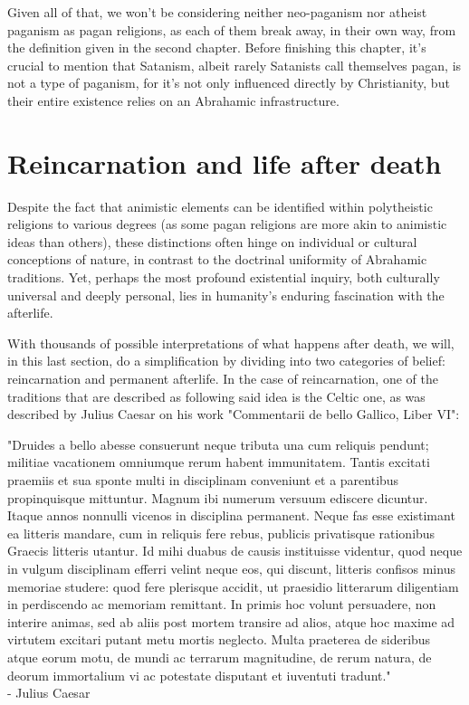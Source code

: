 Given all of that, we won't be considering neither neo-paganism nor atheist paganism as pagan religions, as
each of them break away, in their own way, from the definition given in the second chapter. Before finishing
this chapter, it's crucial to mention that Satanism, albeit rarely Satanists call themselves pagan, is not a
type of paganism, for it's not only influenced directly by Christianity, but their entire existence relies on
an Abrahamic infrastructure.

\section{Reincarnation and life after death}
Despite the fact that animistic elements can be identified within polytheistic religions to various degrees
(as some pagan religions are more akin to animistic ideas than others), these distinctions often hinge on
individual or cultural conceptions of nature, in contrast to the doctrinal uniformity of Abrahamic traditions.
Yet, perhaps the most profound existential inquiry, both culturally universal and deeply personal, lies in
humanity's enduring fascination with the afterlife.

With thousands of possible interpretations of what happens after death, we will, in this last section, do a
simplification by dividing into two categories of belief: reincarnation and permanent afterlife. In the case
of reincarnation, one of the traditions that are described as following said idea is the Celtic one, as was
described by Julius Caesar on his work "Commentarii de bello Gallico, Liber VI":

\begin{center}
    \itshape
    \parbox{0.7\textwidth}{
    "Druides a bello abesse consuerunt neque tributa una cum reliquis pendunt; militiae vacationem omniumque
    rerum habent immunitatem. Tantis excitati praemiis et sua sponte multi in disciplinam conveniunt et a
    parentibus propinquisque mittuntur. Magnum ibi numerum versuum ediscere dicuntur. Itaque annos nonnulli
    vicenos in disciplina permanent. Neque fas esse existimant ea litteris mandare, cum in reliquis fere rebus,
    publicis privatisque rationibus Graecis litteris utantur. Id mihi duabus de causis instituisse videntur,
    quod neque in vulgum disciplinam efferri velint neque eos, qui discunt, litteris confisos minus memoriae
    studere: quod fere plerisque accidit, ut praesidio litterarum diligentiam in perdiscendo ac memoriam
    remittant. In primis hoc volunt persuadere, non interire animas, sed ab aliis post mortem transire ad alios,
    atque hoc maxime ad virtutem excitari putant metu mortis neglecto. Multa praeterea de sideribus atque eorum
    motu, de mundi ac terrarum magnitudine, de rerum natura, de deorum immortalium vi ac potestate disputant et
    iuventuti tradunt."\\
    \normalfont - Julius Caesar \cite{Caesar-49}
    }
\end{center}

